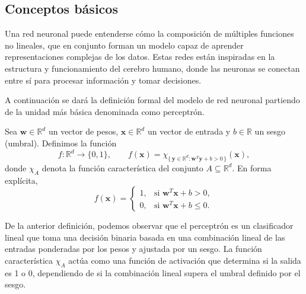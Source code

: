 \subsection{Conceptos básicos}
Una red neuronal puede entenderse cómo la composición de múltiples funciones no lineales, que en conjunto forman un modelo capaz de aprender representaciones complejas de los datos. Estas redes están inspiradas en la estructura y funcionamiento del cerebro humano, donde las neuronas se conectan entre sí para procesar información y tomar decisiones.

A continuación se dará la definición formal del modelo de red neuronal partiendo de la unidad más básica denominada como perceptrón.

\begin{definition}[Perceptrón]
    Sea $\mathbf{w} \in \mathbb{R}^d$ un vector de pesos, $\mathbf{x} \in \mathbb{R}^d$ un vector de entrada y $b \in \mathbb{R}$ un sesgo (umbral). Definimos la función
    \[
        f:\mathbb{R}^d \to \{0,1\}, \qquad f(\mathbf{x}) = \chi_{\{\, \mathbf{y} \in \mathbb{R}^d : \mathbf{w}^T \mathbf{y} + b > 0 \,\}}(\mathbf{x}),
    \]
    donde $\chi_{A}$ denota la función característica del conjunto $A \subseteq \mathbb{R}^d$.
    En forma explícita,
    \[
        f(\mathbf{x}) = \begin{cases}
            1, & \text{si } \mathbf{w}^T \mathbf{x} + b > 0,    \\[6pt]
            0, & \text{si } \mathbf{w}^T \mathbf{x} + b \leq 0.
        \end{cases}
    \]
\end{definition}

De la anterior definición, podemos observar que el perceptrón es un clasificador lineal que toma una decisión binaria basada en una combinación lineal de las entradas ponderadas por los pesos y ajustada por un sesgo. La función característica $\chi_{A}$ actúa como una función de activación que determina si la salida es 1 o 0, dependiendo de si la combinación lineal supera el umbral definido por el sesgo.

